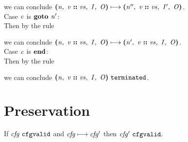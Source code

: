 \documentclass[12pt]{article}
\begin{document}
we can conclude
$\steps{
   \cfg{\nterm{n}}{\cons{\nterm{v}}{\nterm{vs}}}{\nterm{I}}{\nterm{O}}
 }{
   \cfg{\nterm{n''}}{\cons{\nterm{v}}{\nterm{vs}}}{\nterm{I'}}{\nterm{O}}
 }$.\\

Case $\nterm{c}$ is $\goto{\nterm{n'}}$:\\

Then by the rule

\begin{mathpar}
\end{mathpar}

we can conclude
$\steps{
   \cfg{\nterm{n}}{\cons{\nterm{v}}{\nterm{vs}}}{\nterm{I}}{\nterm{O}}
 }{
   \cfg{\nterm{n'}}{\cons{\nterm{v}}{\nterm{vs}}}{\nterm{I}}{\nterm{O}}
 }$.\\

Case $\nterm{c}$ is $\progend$:\\

Then by the rule

\begin{mathpar}
\end{mathpar}

we can conclude
$\terminated{\cfg{\nterm{n}}{\cons{\nterm{v}}{\nterm{vs}}}{\nterm{I}}{\nterm{O}}}$.

\section{Preservation}

If $\cfgvalid{\nterm{cfg}}$ and $\steps{\nterm{cfg}}{\nterm{cfg'}}$ then
$\cfgvalid{\nterm{cfg'}}$.
\end{document}
